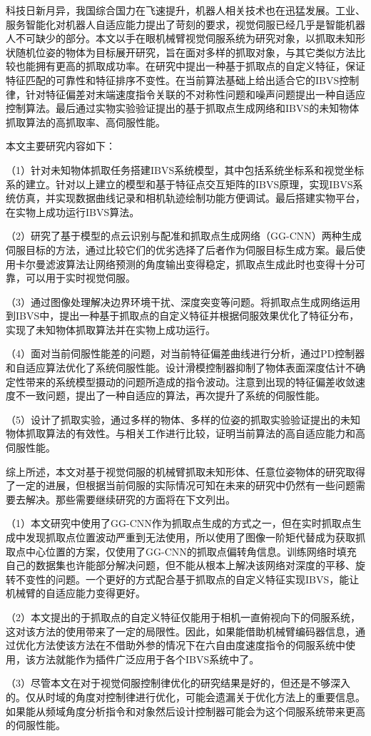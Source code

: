 \begin{conclusions}

科技日新月异，我国综合国力在飞速提升，机器人相关技术也在迅猛发展。工业、服务智能化对机器人自适应能力提出了苛刻的要求，视觉伺服已经几乎是智能机器人不可缺少的部分。本文以手在眼机械臂视觉伺服系统为研究对象，以抓取未知形状随机位姿的物体为目标展开研究，旨在面对多样的抓取对象，与其它类似方法比较也能拥有更高的抓取成功率。在研究中提出一种基于抓取点的自定义特征，保证特征匹配的可靠性和特征排序不变性。在当前算法基础上给出适合它的IBVS控制律，针对特征偏差对末端速度指令关联的不对称性问题和噪声问题提出一种自适应控制算法。最后通过实物实验验证提出的基于抓取点生成网络和IBVS的未知物体抓取算法的高抓取率、高伺服性能。


本文主要研究内容如下：


（1）针对未知物体抓取任务搭建IBVS系统模型，其中包括系统坐标系和视觉坐标系的建立。针对以上建立的模型和基于特征点交互矩阵的IBVS原理，实现IBVS系统仿真，并实现数据曲线记录和相机轨迹绘制功能方便调试。最后搭建实物平台，在实物上成功运行IBVS算法。


（2）研究了基于模型的点云识别与配准和抓取点生成网络（GG-CNN）两种生成伺服目标的方法，通过比较它们的优劣选择了后者作为伺服目标生成方案。最后使用卡尔曼滤波算法让网络预测的角度输出变得稳定，抓取点生成此时也变得十分可靠，可以用于实时视觉伺服。


（3）通过图像处理解决边界环境干扰、深度突变等问题。将抓取点生成网络运用到IBVS中，提出一种基于抓取点的自定义特征并根据伺服效果优化了特征分布，实现了未知物体抓取算法并在实物上成功运行。


（4）面对当前伺服性能差的问题，对当前特征偏差曲线进行分析，通过PD控制器和自适应算法优化了系统伺服性能。设计滑模控制器抑制了物体表面深度估计不确定性带来的系统模型摄动的问题所造成的指令波动。注意到出现的特征偏差收敛速度不一致问题，提出了一种自适应的算法，再次提升了系统的伺服性能。


（5）设计了抓取实验，通过多样的物体、多样的位姿的抓取实验验证提出的未知物体抓取算法的有效性。与相关工作进行比较，证明当前算法的高自适应能力和高伺服性能。


综上所述，本文对基于视觉伺服的机械臂抓取未知形体、任意位姿物体的研究取得了一定的进展，但根据当前伺服的实际情况可知在未来的研究中仍然有一些问题需要去解决。那些需要继续研究的方面将在下文列出。


（1）本文研究中使用了GG-CNN作为抓取点生成的方式之一，但在实时抓取点生成中发现抓取点位置波动严重到无法使用，所以使用了图像一阶矩代替成为获取抓取点中心位置的方案，仅使用了GG-CNN的抓取点偏转角信息。训练网络时填充自己的数据集也许能部分解决问题，但不能从根本上解决该网络对深度的平移、旋转不变性的问题。一个更好的方式配合基于抓取点的自定义特征实现IBVS，能让机械臂的自适应能力变得更好。


（2）本文提出的于抓取点的自定义特征仅能用于相机一直俯视向下的伺服系统，这对该方法的使用带来了一定的局限性。因此，如果能借助机械臂编码器信息，通过优化方法使该方法在不借助外参的情况下在六自由度速度指令的伺服系统中使用，该方法就能作为插件广泛应用于各个IBVS系统中了。


（3）尽管本文在对于视觉伺服控制律优化的研究结果是好的，但还是不够深入的。仅从时域的角度对控制律进行优化，可能会遗漏关于优化方法上的重要信息。如果能从频域角度分析指令和对象然后设计控制器可能会为这个伺服系统带来更高的伺服性能。

\end{conclusions}
